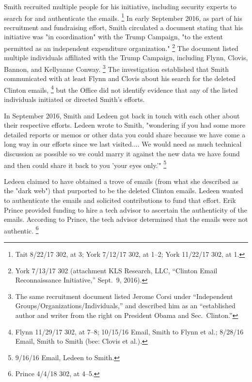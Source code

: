 Smith recruited multiple people for his initiative, including security experts to search for and authenticate the emails.%
\footnote{Tait 8/22/17 302, at 3; York 7/12/17 302, at 1--2; York 11/22/17 302, at 1.}
In early September 2016, as part of his recruitment and fundraising effort, Smith circulated a document stating that his initiative was "in coordination" with the Trump Campaign, "to the extent permitted as an independent expenditure organization."%
\footnote{York 7/13/17 302 (attachment KLS Research, LLC, “Clinton Email Reconnaissance Initiative,” Sept.~9, 2016).}
The document listed multiple individuals affiliated with the Trump Campaign, including Flynn, Clovis, Bannon,
and Kellyanne Conway.%
\footnote{The same recruitment document listed Jerome Corsi under “Independent Groups/Organizations/Individuals,” and described him as an “established author and writer from the right on President Obama and Sec.~Clinton.”}
The investigation established that Smith communicated with at least Flynn and Clovis about his search for the deleted Clinton emails,%
\footnote{Flynn 11/29/17 302, at 7--8; 10/15/16 Email, Smith to Flynn et al.;
8/28/16 Email, Smith to Smith (bee: Clovis et al.).}
but the Office did not identify evidence that any of the listed individuals initiated or directed Smith's efforts.

In September 2016, Smith and Ledeen got back in touch with each other about their respective efforts.
Ledeen wrote to Smith, "wondering if you had some more detailed reports or memos or other data you could share because we have come a long way in our efforts since we last visited....
We would need as much technical discussion as possible so we could marry it against the new data we have found and then could share it back to you 'your eyes only.'"%
\footnote{9/16/16 Email, Ledeen to Smith.}

Ledeen claimed to have obtained a trove of emails (from what she described as the "dark web") that purported to be the deleted Clinton emails.
Ledeen wanted to authenticate the emails and solicited contributions to fund that effort.
Erik Prince provided funding to hire a tech advisor to ascertain the authenticity of the emails.
According to Prince, the tech advisor determined that the emails were not authentic.%
\footnote{Prince 4/4/18 302, at 4--5.}

